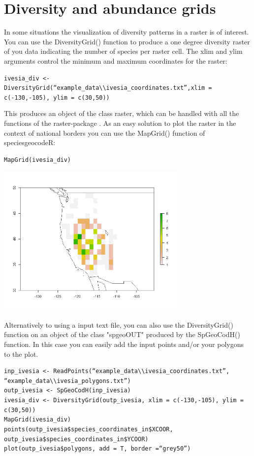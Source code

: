 \documentclass[a4paper,titlepage,11pt]{scrreprt}
\begin{document}
\section{Diversity and abundance grids}
In some situations the visualization of diversity patterns in a raster is of interest. You can use the DiversityGrid() function to produce a one degree diversity raster of you data indicating the number of species per raster cell. The xlim and ylim arguments control the minimum and maximum coordinates for the raster:

\texttt{ivesia\_div \textless- DiversityGrid(``example\_data\textbackslash \textbackslash ivesia\_coordinates.txt'',xlim = c(-130,-105), ylim = c(30,50))}

This produces an object of the class raster, which can be handled with all the functions of the raster-package \citep{hijmans2014}. As an easy solution to plot the raster in the context of national borders you can use the MapGrid() function of speciesgeocodeR:

\texttt{MapGrid(ivesia\_div)}

\begin{center}
\includegraphics[width=0.7\textwidth]{figures/diversity_grid_textfile.jpeg}\\
\end{center}

Alternatively to using a input text file, you can also use the DiversityGrid() function on an object of the class "spgeoOUT" produced by the SpGeoCodH() function. In this case you can easily add the input points and/or your polygons to the plot.

\texttt{inp\_ivesia  \textless- ReadPoints(``example\_data\textbackslash \textbackslash ivesia\_coordinates.txt'', ``example\_data\textbackslash \textbackslash ivesia\_polygons.txt'')}\\
\texttt{outp\_ivesia \textless- SpGeoCodH(inp\_ivesia)}\\
\texttt{ivesia\_div \textless- DiversityGrid(outp\_ivesia, xlim = c(-130,-105), ylim = c(30,50))}\\
\texttt{MapGrid(ivesia\_div)}\\
\texttt{points(outp\_ivesia\$species\_coordinates\_in\$XCOOR, outp\_ivesia\$species\_coordinates\_in\$YCOOR)}\\
\texttt{plot(outp\_ivesia\$polygons, add = T, border =``grey50'')}
\end{document}
